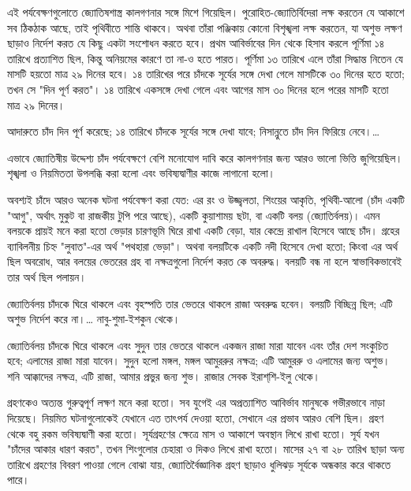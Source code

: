 এই পর্যবেক্ষণগুলোতে জ্যোতিষশাস্ত্র কালগণনার সঙ্গে মিশে গিয়েছিল। পুরোহিত-জ্যোতির্বিদেরা লক্ষ করতেন যে আকাশে সব ঠিকঠাক আছে, তাই পৃথিবীতে শান্তি থাকবে। অথবা তাঁরা পঞ্জিকায় কোনো বিশৃঙ্খলা লক্ষ করতেন, যা অশুভ লক্ষণ ছাড়াও নির্দেশ করত যে কিছু একটা সংশোধন করতে হবে। প্রথম আবির্ভাবের দিন থেকে হিসাব করলে পূর্ণিমা ১৪ তারিখে প্রত্যাশিত ছিল, কিন্তু অনিয়মের কারণে তা না-ও হতে পারত। পূর্ণিমা ১৩ তারিখে এলে তাঁরা সিদ্ধান্ত নিতেন যে মাসটি হয়তো মাত্র ২৯ দিনের হবে। ১৪ তারিখের পরে চাঁদকে সূর্যের সঙ্গে দেখা গেলে মাসটিকে ৩০ দিনের হতে হতো; তখন সে "দিন পূর্ণ করত"। ১৪ তারিখে একসঙ্গে দেখা গেলে এবং আগের মাস ৩০ দিনের হলে পরের মাসটি হতো মাত্র ২৯ দিনের।

আদারুতে চাঁদ দিন পূর্ণ করেছে; ১৪ তারিখে চাঁদকে সূর্যের সঙ্গে দেখা যাবে; নিসান্নুতে চাঁদ দিন ফিরিয়ে নেবে।…

এভাবে জ্যোতিষীয় উদ্দেশ্য চাঁদ পর্যবেক্ষণে বেশি মনোযোগ দাবি করে কালগণনার জন্য আরও ভালো ভিত্তি জুগিয়েছিল। শৃঙ্খলা ও নিয়মিততা উপলব্ধি করা হলো এবং ভবিষ্যদ্বাণীর কাজে লাগানো হলো।

অবশ্যই চাঁদে আরও অনেক ঘটনা পর্যবেক্ষণ করা যেত: এর রং ও উজ্জ্বলতা, শিংয়ের আকৃতি, পৃথিবী-আলো (চাঁদ একটি "আগু", অর্থাৎ মুকুট বা রাজকীয় টুপি পরে আছে), একটি কুয়াশাময় ছটা, বা একটি বলয় (জ্যোতির্বলয়)। এমন বলয়কে প্রায়ই মনে করা হতো ভেড়ার চারণভূমি ঘিরে রাখা একটি বেড়া, যার কেন্দ্রে রাখাল হিসেবে আছে চাঁদ। গ্রহের ব্যাবিলনীয় চিহ্ন "লুবাত"-এর অর্থ "পথহারা ভেড়া"। অথবা বলয়টিকে একটি নদী হিসেবে দেখা হতো; কিংবা এর অর্থ ছিল অবরোধ, আর বলয়ের ভেতরের গ্রহ বা নক্ষত্রগুলো নির্দেশ করত কে অবরুদ্ধ। বলয়টি বন্ধ না হলে স্বাভাবিকভাবেই তার অর্থ ছিল পলায়ন।

জ্যোতির্বলয় চাঁদকে ঘিরে থাকলে এবং বৃহস্পতি তার ভেতরে থাকলে রাজা অবরুদ্ধ হবেন। বলয়টি বিচ্ছিন্ন ছিল; এটি অশুভ নির্দেশ করে না।… নাবু-শুমা-ইশকুন থেকে।

জ্যোতির্বলয় চাঁদকে ঘিরে থাকলে এবং সুদুন তার ভেতরে থাকলে একজন রাজা মারা যাবেন এবং তাঁর দেশ সংকুচিত হবে; এলামের রাজা মারা যাবেন। সুদুন হলো মঙ্গল, মঙ্গল আমুররুর নক্ষত্র; এটি আমুররু ও এলামের জন্য অশুভ। শনি আক্কাদের নক্ষত্র, এটি রাজা, আমার প্রভুর জন্য শুভ। রাজার সেবক ইরাশ্‌শি-ইলু থেকে।

গ্রহণকেও অত্যন্ত গুরুত্বপূর্ণ লক্ষণ মনে করা হতো। সব যুগেই এর অপ্রত্যাশিত আবির্ভাব মানুষকে গভীরভাবে নাড়া দিয়েছে। নিয়মিত ঘটনাগুলোকেই যেখানে এত তাৎপর্য দেওয়া হতো, সেখানে এর প্রভাব আরও বেশি ছিল। গ্রহণ থেকে বহু রকম ভবিষ্যদ্বাণী করা হতো। সূর্যগ্রহণের ক্ষেত্রে মাস ও আকাশে অবস্থান লিখে রাখা হতো। সূর্য যখন "চাঁদের আকার ধারণ করত", তখন শিংগুলোর চেহারা ও দিকও লিখে রাখা হতো। মাসের ২৭ বা ২৮ তারিখ ছাড়া অন্য তারিখে গ্রহণের বিবরণ পাওয়া গেলে বোঝা যায়, জ্যোতির্বৈজ্ঞানিক গ্রহণ ছাড়াও ধুলিঝড় সূর্যকে অন্ধকার করে থাকতে পারে।

